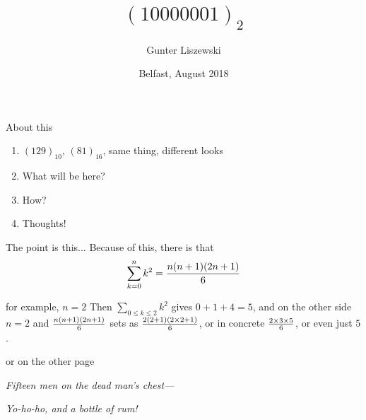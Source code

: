 \documentclass[pdf]{beamer}
\title{$(10000001)_2$}
\author{Gunter Liszewski}
\date{Belfast, August 2018}
\begin{document}
\begin{frame}
  \titlepage
\end{frame}


\begin{frame}{About this}
  \begin{enumerate}[A]
    \pause
    \item{} $(129)_{10}$, $(81)_{16}$, same thing, different looks
    \pause
    \item{} What will be here?
    \pause
    \item{} How?
    \pause
    \item{} Thoughts!
  \end{enumerate}
\end{frame}

\begin{frame}{The point is this...}
  Because of this, there is that
$$\sum_{k=0}^{n}{k^2}={n(n+1)(2n+1)\over 6}$$
\end{frame}


\begin{frame}{for example, $n=2$}
  Then $\sum_{0\le k\le2}k^2$ gives $0+1+4=5$, and on the other side $n=2$ and ${n(n+1)(2n+1)\over 6}$
sets as ${2(2+1)(2\times2+1)\over 6}$, or in concrete $2\times3\times5\over6$, or even just $5$.
\end{frame}

\begin{frame}{or on the other page}

  {\hfil\sl{}Fifteen men on the dead man's chest---}

             {\hfil\sl{}Yo-ho-ho, and a bottle of rum!}
\end{frame}
\end{document}
